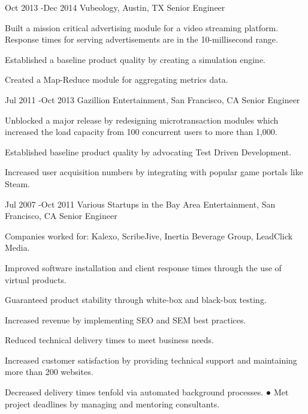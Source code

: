 \documentclass[10pt]{article} %
\begin{document}

\job
{Oct 2013 -}{Dec 2014}
{Vubeology, Austin, TX}
{}
{Senior Engineer}
{
\begin{itemize-noindent}
\item{Built a mission critical advertising module for a video streaming platform. Response times for serving advertisements are in the 10-millisecond range.} 
\item{Established a baseline product quality by creating a simulation engine.} 
\item{Created a Map-Reduce module for aggregating metrics data.}
\end{itemize-noindent}
}


\job
{Jul 2011 -}{Oct 2013}
{Gazillion Entertainment, San Francisco, CA}
{}
{Senior Engineer}
{
\begin{itemize-noindent}

\item{Unblocked a major release by redesigning microtransaction modules which increased the load capacity from 100 concurrent users to more than 1,000.}
\item{Established baseline product quality by advocating Test Driven Development.}
\item{Increased user acquisition numbers by integrating with popular game portals like Steam.} 
\end{itemize-noindent}
}


\job
{Jul 2007 -}{Oct 2011}
{Various Startups in the Bay Area Entertainment, San Francisco, CA}
{}
{Senior Engineer}
{
\begin{itemize-noindent}

\item{Companies worked for: Kalexo, ScribeJive, Inertia Beverage Group, LeadClick Media.} 
\item{Improved software installation and client response times through the use of virtual products.}
\item{Guaranteed product stability through white-box and black-box testing.}
\item{Increased revenue by implementing SEO and SEM best practices.}
\item{Reduced technical delivery times to meet business needs.} 
\item{Increased customer satisfaction by providing technical support and maintaining more than 200 websites.}
\item{Decreased delivery times tenfold via automated background processes. ● Met project deadlines by managing and mentoring consultants.}

\end{itemize-noindent}
}
\end{document}
